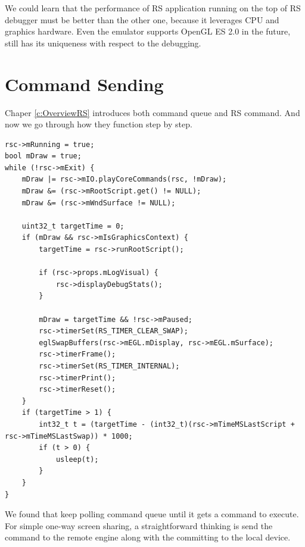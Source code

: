 We could learn that the performance of RS application running on the top of RS debugger must be better than the other one, because it leverages CPU and graphics hardware. Even the emulator supports OpenGL ES 2.0 in the future, \RRS{} still has its uniqueness with respect to the debugging.

\section{Command Sending}
\label{s:CommandSending}
Chaper \ref{c:OverviewRS} introduces both command queue and RS command. And now we go through how they function step by step.

\begin{lstlisting}
rsc->mRunning = true;
bool mDraw = true;
while (!rsc->mExit) {
    mDraw |= rsc->mIO.playCoreCommands(rsc, !mDraw);
    mDraw &= (rsc->mRootScript.get() != NULL);
    mDraw &= (rsc->mWndSurface != NULL);

    uint32_t targetTime = 0; 
    if (mDraw && rsc->mIsGraphicsContext) {
        targetTime = rsc->runRootScript();

        if (rsc->props.mLogVisual) {
            rsc->displayDebugStats();
        }    

        mDraw = targetTime && !rsc->mPaused;
        rsc->timerSet(RS_TIMER_CLEAR_SWAP);
        eglSwapBuffers(rsc->mEGL.mDisplay, rsc->mEGL.mSurface);
        rsc->timerFrame();
        rsc->timerSet(RS_TIMER_INTERNAL);
        rsc->timerPrint();
        rsc->timerReset();
    }    
    if (targetTime > 1) { 
        int32_t t = (targetTime - (int32_t)(rsc->mTimeMSLastScript + rsc->mTimeMSLastSwap)) * 1000;
        if (t > 0) { 
            usleep(t);
        }    
    }    
}    
\end{lstlisting}


We found that \Core{} keep polling command queue until it gets a command to execute. For simple one-way screen sharing, a straightforward thinking is send the command to the remote engine along with the committing to the local device.

